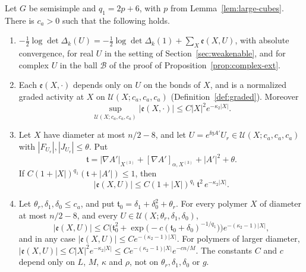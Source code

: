 \begin{proposition}\label{prop:one-loop-polymer}
Let $G$ be semisimple and $q_1=2p+6$, with $p$ from Lemma~\ref{lem:large-cubes}. There is $c_a>0$ such that the following holds.
\begin{enumerate}[label=(\alph*)]
\item $-\frac12\log\det\Delta_k(U)=-\frac12\log\det\Delta_k(1)+\sum_X\mathfrak e(X,U)$, with absolute convergence, for real $U$ in the setting of Section~\ref{sec:weakenable}, and for complex $U$ in the ball $\mathcal B$ of the proof of Proposition~\ref{prop:complex-ext}.
\item Each $\mathfrak e(X,\cdot)$ depends only on $U$ on the bonds of $X$, and is a normalized graded activity at $X$ on $\mathcal U(X;c_a,c_a,c_a)$ (Definition~\ref{def:graded}). Moreover
\[
\sup_{\mathcal U(X;c_a,c_a,c_a)}|\mathfrak e(X,\cdot)|\le C|X|^2e^{-\kappa_2|X|} .
\]
\item Let $X$ have diameter at most $n/2-8$, and let $U=e^{\ii\eta A'}U_r\in\mathcal U(X;c_a,c_a,c_a)$ with $|F_{U_r}|,|J_{U_r}|\le\theta$. Put
\[
\mathfrak t=|\nabla A'|_{X^{(3)}}+[\nabla A']_{\alpha,X^{(3)}}+|A'|^2+\theta .
\]
If $C(1+|X|)^{q_1}(\mathfrak t+|A'|)\le1$, then
\[
|\mathfrak e(X,U)|\le C(1+|X|)^{q_1}\,\mathfrak t^2\,e^{-\kappa_2|X|} .
\]
\item Let $\theta_r,\delta_1,\delta_0\le c_a$, and put $\mathfrak t_0=\delta_1+\delta_0^2+\theta_r$. For every polymer $X$ of diameter at most $n/2-8$, and every $U\in\mathcal U(X;\theta_r,\delta_1,\delta_0)$,
\[
|\mathfrak e(X,U)|\le C\Big(\mathfrak t_0^2+\exp\big(-c(\mathfrak t_0+\delta_0)^{-1/q_1}\big)\Big)e^{-(\kappa_2-1)|X|},
\]
and in any case $|\mathfrak e(X,U)|\le Ce^{-(\kappa_2-1)|X|}$. For polymers of larger diameter, $|\mathfrak e(X,U)|\le C|X|^2e^{-\kappa_2|X|}\le Ce^{-(\kappa_2-1)|X|}e^{-cn/M}$. The constants $C$ and $c$ depend only on $L$, $M$, $\kappa$ and $\rho$, not on $\theta_r,\delta_1,\delta_0$ or $g$.
\end{enumerate}
\end{proposition}

